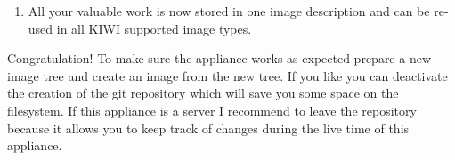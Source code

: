 \begin{enumerate}
\begin{itemize}
\begin{Command}{8cm}
git diff > /tmp/appliancePatch
\end{Command}

            The created patch should become part of your image description
            and you should make sure the patch is applied when preparing the
            image. According to this the command:

\begin{Command}{8cm}
patch -p0 < appliancePatch
\end{Command}

            needs to be added as part of your  script

      \item Check for new non binary files added. This can be done by
            calling:
            
\begin{Command}{4cm}
git status
\end{Command}

	        All files not under version control so far will be listed by
            the command above. Check the contents of this list make sure
            to add all files which are not created automatically to
            become part of your image description. To do this simply
            clone (copy) these files with respect to the filesystem
            structure as overlay files in your image description 
            directory.
      \end{itemize}
\item All your valuable work is now stored in one image description
      and can be re-used in all KIWI supported image types. 
\end{enumerate}

Congratulation!
To make sure the appliance works as expected prepare a new image
tree and create an image from the new tree. If you like you can
deactivate the creation of the git repository which will save you
some space on the filesystem. If this appliance is a server I recommend
to leave the repository because it allows you to keep track of changes
during the live time of this appliance.
